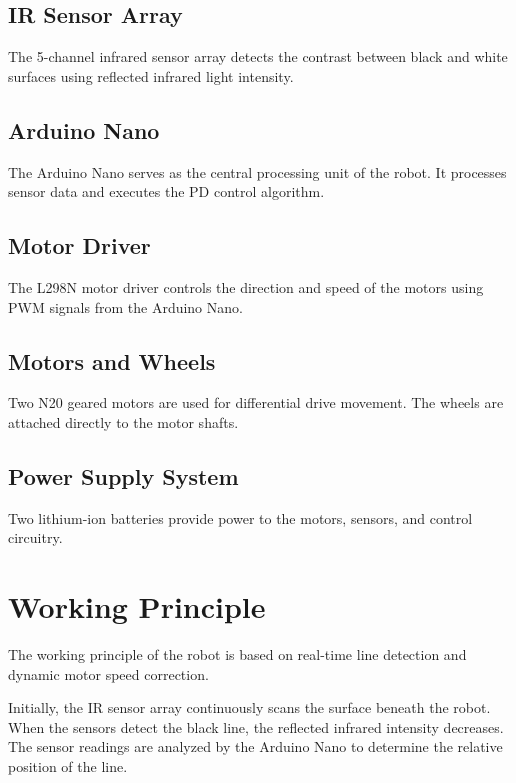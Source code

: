 \documentclass[12pt,a4paper,oneside]{report}
\begin{document}
\subsection{IR Sensor Array}

The 5-channel infrared sensor array detects the contrast between black and white surfaces using reflected infrared light intensity.

\subsection{Arduino Nano}

The Arduino Nano serves as the central processing unit of the robot. It processes sensor data and executes the PD control algorithm.

\subsection{Motor Driver}

The L298N motor driver controls the direction and speed of the motors using PWM signals from the Arduino Nano.

\subsection{Motors and Wheels}

Two N20 geared motors are used for differential drive movement. The wheels are attached directly to the motor shafts.

\subsection{Power Supply System}

Two lithium-ion batteries provide power to the motors, sensors, and control circuitry.


\section{Working Principle}

The working principle of the robot is based on real-time line detection and dynamic motor speed correction.

Initially, the IR sensor array continuously scans the surface beneath the robot. When the sensors detect the black line, the reflected infrared intensity decreases. The sensor readings are analyzed by the Arduino Nano to determine the relative position of the line.
\end{document}
